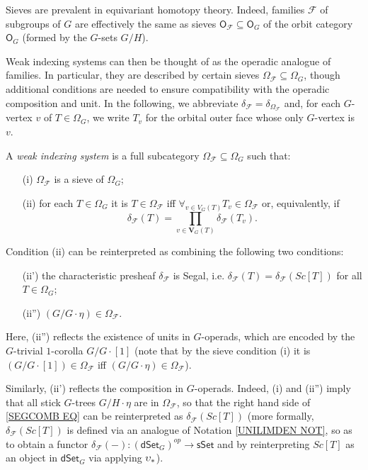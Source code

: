 \documentclass[a4paper,10pt
 ,draft
]{article}%
\begin{document}
Sieves are prevalent in equivariant homotopy theory. Indeed, families $\mathcal{F}$ of subgroups of $G$ are effectively the same as sieves $\mathsf{O}_{\mathcal{F}} \subseteq \mathsf{O}_G$
of the orbit category
$\mathsf{O}_G$ (formed by the $G$-sets $G/H$).

Weak indexing systems can then be thought of as the operadic analogue of families. In particular, they are described by certain sieves $\Omega_{\mathcal{F}} \subseteq \Omega_G$,
though additional conditions are needed to ensure compatibility with the operadic composition and unit.
In the following, we abbreviate 
$\delta_{\mathcal{F}} = \delta_{\Omega_{\mathcal{F}}}$ and,
for each $G$-vertex $v$ of $T \in \Omega_G$, we write 
$T_v$ for the orbital outer face whose only
$G$-vertex is $v$.

\begin{definition}
A \textit{weak indexing system} is a full subcategory
$\Omega_{\mathcal{F}} \subseteq \Omega_G$ such that:
\begin{itemize}
	\item[(i)] $\Omega_{\mathcal{F}}$ is a sieve of 
              $\Omega_G$;              
	\item[(ii)] for each $T \in \Omega_G$ it is
	$T \in \Omega_{\mathcal{F}}$ iff 
	$\forall_{v \in V_G(T)} T_v \in \Omega_{\mathcal{F}}$
	or, equivalently, if
        \begin{equation}\label{SEGCOMB EQ}
              \delta_{\mathcal{F}}(T) =
              \prod_{v \in \boldsymbol{V}_G(T)}\delta_{\mathcal{F}}(T_v).
        \end{equation}
\end{itemize}
\end{definition}


\begin{remark}\label{SEGCOMB REM}
	Condition (ii) can be reinterpreted as combining the following two conditions:
\begin{itemize}
	\item[(ii')] the characteristic presheaf $\delta_{\mathcal{F}}$ is Segal, i.e. 
	$\delta_{\mathcal{F}}(T) = 
	\delta_{\mathcal{F}}(Sc[T])$
	for all $T \in \Omega_G$;
	\item[(ii'')] $(G/G \cdot \eta) \in \Omega_{\mathcal{F}}$.
\end{itemize}

Here, (ii'') reflects the existence of units in $G$-operads,
which are encoded by the
$G$-trivial $1$-corolla $G/G\cdot [1]$
(note that by the sieve condition (i) it is
$(G/G\cdot [1]) \in \Omega_{\mathcal{F}}$
iff 
$(G/G\cdot \eta) \in \Omega_{\mathcal{F}}$).

Similarly, (ii') reflects the composition in $G$-operads.
Indeed, (i) and (ii'') imply that
all stick $G$-trees $G/H \cdot \eta$ are in 
$\Omega_{\mathcal{F}}$,
so that the right hand side of \eqref{SEGCOMB EQ}
can be reinterpreted as $\delta_{\mathcal{F}}(Sc[T])$
(more formally, $\delta_{\mathcal{F}}(Sc[T])$ is defined via an analogue of 
Notation \ref{UNILIMDEN NOT}, 
so as to obtain a functor
$\delta_{\mathcal{F}}(-) \colon 
(\mathsf{dSet}_G)^{op} \to \mathsf{sSet}$ 
and by reinterpreting $Sc[T]$ as an object in 
$\mathsf{dSet}_G$ via applying $\upsilon_{\**}$).
\end{remark}
\end{document}
